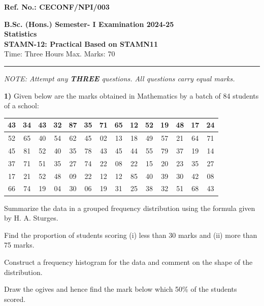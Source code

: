 \documentclass[11pt,a4paper]{article}
\begin{document}
\begin{flushright}
  \small   \textbf{Ref. No.: CECONF/NPI/003}
\end{flushright}


\begin{center}
  {\large\bfseries B.Sc. (Hons.) Semester- I Examination 2024-25}\\[4pt]
  {\large\bfseries Statistics}\\[4pt]
  {\large\bfseries STAMN-12: Practical Based on STAMN11}\\[4pt]
  {\normalsize Time: Three Hours \hfill Max. Marks: 70}
\end{center}

\rule{\linewidth}{0.4pt}\smallskip



\noindent   \textit{NOTE: Attempt any   \textbf{THREE} questions. All questions carry equal marks.}
\bigskip




\noindent   \textbf{1)} Given below are the marks obtained in Mathematics by a batch of 84 students of a school:


\begin{center}
\small

\begin{tabular}{|c|c|c|c|c|c|c|c|c|c|c|c|c|c|}
\hline
43 & 34 & 43 & 32 & 87 & 35 & 71 & 65 & 12 & 52 & 19 & 48 & 17 & 24 \\ \hline
52 & 65 & 40 & 54 & 62 & 45 & 02 & 13 & 18 & 49 & 57 & 21 & 64 & 71 \\ \hline
45 & 81 & 52 & 40 & 35 & 78 & 43 & 45 & 44 & 55 & 79 & 37 & 19 & 14 \\ \hline
37 & 71 & 51 & 35 & 27 & 74 & 22 & 08 & 22 & 15 & 20 & 23 & 35 & 27 \\ \hline
17 & 21 & 52 & 48 & 09 & 22 & 12 & 12 & 85 & 40 & 39 & 30 & 42 & 08 \\ \hline
66 & 74 & 19 & 04 & 30 & 06 & 19 & 31 & 25 & 38 & 32 & 51 & 68 & 43 \\ \hline
\end{tabular}
\end{center}


\begin{parts}
  \item Summarize the data in a grouped frequency distribution using the formula given by H. A. Sturges.
  \item Find the proportion of students scoring (i) less than 30 marks and (ii) more than 75 marks.
  \item Construct a frequency histogram for the data and comment on the shape of the distribution.
  \item Draw the ogives and hence find the mark below which 50\% of the students scored.
\end{parts}
\end{document}
